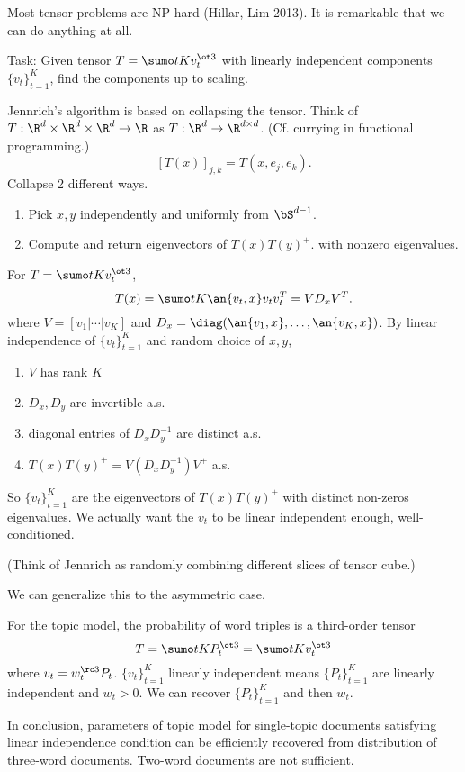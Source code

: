 Most tensor problems are NP-hard (Hillar, Lim 2013). It is remarkable that we can do anything at all.

Task: Given tensor $T=\sumo tK v_t^{\ot 3}$ with linearly independent components $\{v_t\}_{t=1}^K$, find the components up to scaling.

Jennrich's algorithm is based on collapsing the tensor. Think of $T:\R^d\times \R^d \times \R^d \to \R$ as $T:\R^d \to \R^{d\times d}$. (Cf. currying in functional programming.)
$$
[T(x)]_{j,k} = T(x,e_j,e_k).
$$
Collapse 2 different ways.
\begin{alg}[Jennrich]
\begin{enumerate}
\item
Pick $x,y$ independently and uniformly from $\bS^{d-1}$.
\item
Compute and return eigenvectors of $T(x)T(y)^{+}$. with nonzero eigenvalues.
\end{enumerate}
\end{alg}
For $T=\sumo tK v_t^{\ot 3}$, 
$$
T(x) = \sumo tK \an{v_t,x}v_tv_t^T = VD_xV^T.
$$
where $V=[v_1|\cdots |v_K]$ and $D_x = \diag(\an{v_1,x},\ldots, \an{v_K, x})$. By linear independence of $\{v_t\}_{t=1}^K$ and random choice of $x,y$, 
\begin{enumerate}
\item
$V$ has rank $K$
\item
$D_x,D_y$ are invertible a.s.
\item
diagonal entries of $D_xD_y^{-1}$ are distinct a.s.
\item
$T(x)T(y)^{+} = V(D_xD_y^{-1}) V^+$ a.s.
\end{enumerate}
So $\{v_t\}_{t=1}^K$ are the eigenvectors of $T(x)T(y)^+$ with distinct non-zeros eigenvalues. We actually want the $v_t$ to be linear independent enough, well-conditioned.

(Think of Jennrich as randomly combining different slices of tensor cube.)

We can generalize this to the asymmetric case. %

For the topic model, the probability of word triples is a third-order tensor
$$
T = \sumo tK P_t^{\ot 3} = \sumo tK v_t^{\ot 3}
$$
where $v_t=w_t^{\rc 3} P_t$. $\{v_t\}_{t=1}^K$ linearly independent means $\{P_t\}_{t=1}^K$ are linearly independent and $w_t>0$. 
We can recover $\{P_t\}_{t=1}^K$ and then $w_t$.

In conclusion, parameters of topic model for single-topic documents satisfying linear independence condition can be efficiently recovered from distribution of three-word documents. Two-word documents are not sufficient.

